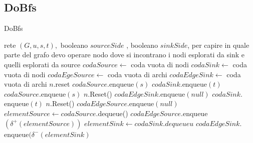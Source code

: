 \documentclass{article}
\begin{document}
\subsection{DoBfs}
\begin{algorithm}
    \caption{DoBfs}
    \begin{algorithmic}[1]
        \REQUIRE rete $(G,u,s,t),$ booleano $sourceSide$ , booleano $sinkSide$, per capire in quale parte del grafo devo operare
        \ENSURE nodo dove si incontrano i nodi esplorati da sink e quelli esplorati da source
        \STATE $codaSource \leftarrow $ coda vuota di nodi
        \STATE $codaSink \leftarrow$ coda vuota di nodi
        \STATE $codaEgeSource \leftarrow$ coda vuota di archi
        \STATE $codaEdgeSink \leftarrow$ coda vuota di archi
        \STATE $n.$reset
        \ENDFOR
        \STATE $codaSource$.enqueue$(s)$
        \STATE $codaSink.$enqueue$(t)$
        \STATE $codaSource$.enqueue$(s)$
        \STATE $n.$Reset()
        \ENDFOR
        \STATE $codaEdgeSink$.enqueue$(null)$
        \STATE $codaSink.$enqueue$(t)$
        \STATE $n.$Reset()
        \ENDFOR
        \STATE $codaEdgeSource.$enqueue$(null)$
        \ENDIF
        \STATE $elementSource \leftarrow codaSource.$dequeue()
        \STATE $codaEdgeSource.$enqueue$(\delta^+(elementSource))$
        \ENDIF
        \STATE $elementSink \leftarrow codaSink.dequeueu$
        \STATE $codaEdgeSink.$enqueue$(\delta^-(elementSink)$
        \ENDIF
    \end{algorithmic}
\end{algorithm}
\newpage
\end{document}
